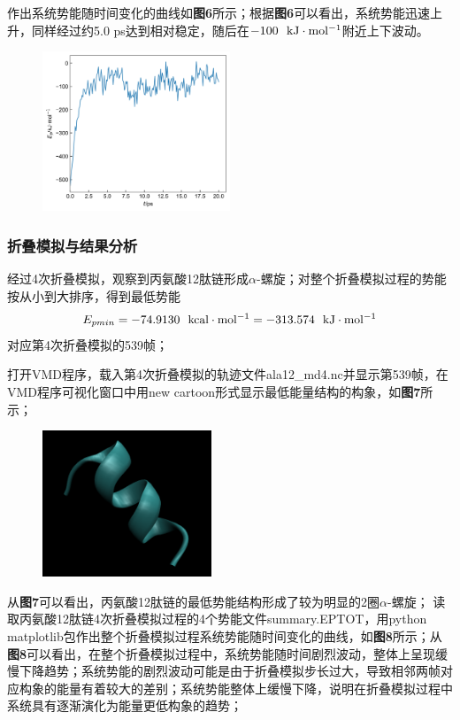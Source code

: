 \documentclass[12pt]{article}
\begin{document}
\par
作出系统势能随时间变化的曲线如\textbf{图6}所示；根据\textbf{图6}可以看出，系统势能迅速上升，同样经过约5.0 ps达到相对稳定，随后在$-100 \ \ {\rm kJ \cdot mol^{-1}}$附近上下波动。
\begin{figure}[h]
	\centering
	\includegraphics[width=0.5\textwidth]{eptot.jpg}
\end{figure}
\par

 	\subsubsection{折叠模拟与结果分析}
经过4次折叠模拟，观察到丙氨酸12肽链形成$\alpha$-螺旋；对整个折叠模拟过程的势能按从小到大排序，得到最低势能
$$ E_{pmin}=-74.9130\ \ \rm kcal \cdot mol^{-1} =-313.574\ \ \rm kJ \cdot mol^{-1}$$
对应第4次折叠模拟的539帧；\par
打开VMD程序，载入第4次折叠模拟的轨迹文件ala12\_md4.nc并显示第539帧，在VMD程序可视化窗口中用new cartoon形式显示最低能量结构的构象，如\textbf{图7}所示；
\begin{figure}[h]
	\centering
	\includegraphics[width=0.45\textwidth]{2.png}
\end{figure}
\par
从\textbf{图7}可以看出，丙氨酸12肽链的最低势能结构形成了较为明显的2圈$\alpha$-螺旋；
读取丙氨酸12肽链4次折叠模拟过程的4个势能文件summary.EPTOT，用python matplotlib包作出整个折叠模拟过程系统势能随时间变化的曲线，如\textbf{图8}所示；从\textbf{图8}可以看出，在整个折叠模拟过程中，系统势能随时间剧烈波动，整体上呈现缓慢下降趋势；系统势能的剧烈波动可能是由于折叠模拟步长过大，导致相邻两帧对应构象的能量有着较大的差别；系统势能整体上缓慢下降，说明在折叠模拟过程中系统具有逐渐演化为能量更低构象的趋势；\par
\end{document}

